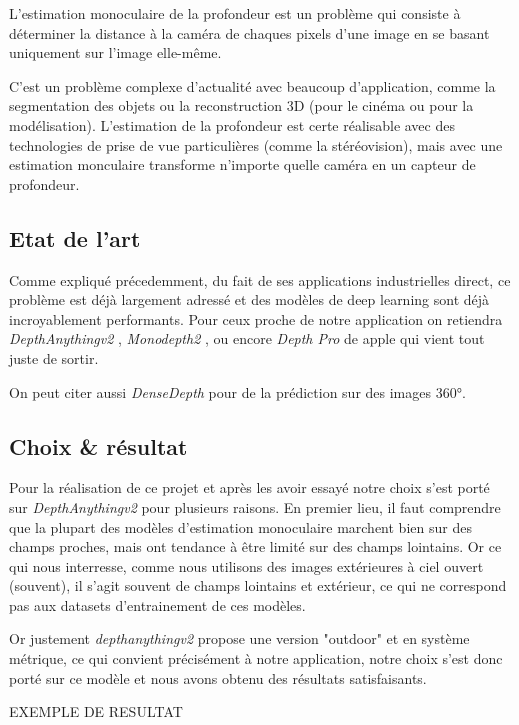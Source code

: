 
L'estimation monoculaire de la profondeur est un problème qui consiste à déterminer la distance à la caméra de chaques pixels d'une image en se basant uniquement sur l'image elle-même.

C'est un problème complexe d'actualité avec beaucoup d'application, comme la segmentation des objets ou la reconstruction 3D (pour le cinéma ou pour la modélisation). L'estimation de la profondeur est certe réalisable avec des technologies de prise de vue particulières (comme la stéréovision), mais avec une estimation monculaire transforme n'importe quelle caméra en un capteur de profondeur.

\subsection{Etat de l'art}

Comme expliqué précedemment, du fait de ses applications industrielles direct, ce problème est déjà largement adressé et des modèles de deep learning sont déjà incroyablement performants. Pour ceux proche de notre application on retiendra \textit{DepthAnythingv2} \cite{depthanythingv2}, \textit{Monodepth2} \cite{MonoDepth2}, ou encore \textit{Depth Pro} \cite{depthpro} de apple qui vient tout juste de sortir.

On peut citer aussi \textit{DenseDepth} \cite{DenseDepth} pour de la prédiction sur des images 360°.

\subsection{Choix \& résultat}

Pour la réalisation de ce projet et après les avoir essayé notre choix s'est porté sur \textit{DepthAnythingv2} pour plusieurs raisons. En premier lieu, il faut comprendre que la plupart des modèles d'estimation monoculaire marchent bien sur des champs proches, mais ont tendance à être limité sur des champs lointains. Or ce qui nous interresse, comme nous utilisons des images extérieures à ciel ouvert (souvent), il s'agit souvent de champs lointains et extérieur, ce qui ne correspond pas aux datasets d'entrainement de ces modèles. 

Or justement \textit{depthanythingv2} propose une version "outdoor" et en système métrique, ce qui convient précisément à notre application, notre choix s'est donc porté sur ce modèle et nous avons obtenu des résultats satisfaisants.

EXEMPLE DE RESULTAT



